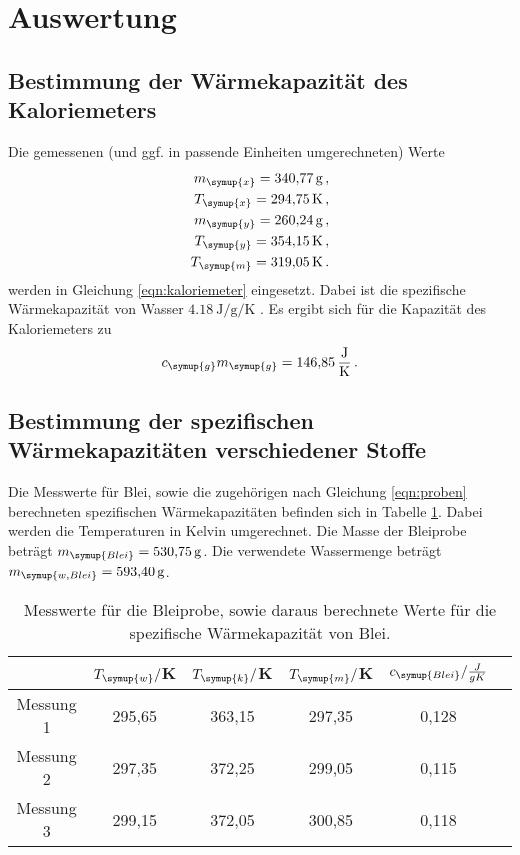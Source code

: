 \section{Auswertung}
\label{sec:Auswertung}

\subsection{Bestimmung der Wärmekapazität des Kaloriemeters}
\label{sec:Auswertung_Kaloriemeter}

Die gemessenen (und ggf. in passende Einheiten umgerechneten) Werte
\begin{align*}
  m_{\symup{x}} = \SI{340.77}{\gram}   \,,\\
  T_{\symup{x}} = \SI{294.75}{\kelvin} \,,\\
  m_{\symup{y}} = \SI{260.24}{\gram}   \,,\\
  T_{\symup{y}} = \SI{354.15}{\kelvin} \,,\\
  T_{\symup{m}} = \SI{319.05}{\kelvin} \,.\\
\end{align*}
werden in Gleichung \eqref{eqn:kaloriemeter} eingesetzt. Dabei ist die spezifische Wärmekapazität
von Wasser $\SI{4.18}{\joule\per\gram\per\kelvin}$ \cite{Versuchsanleitung}. Es ergibt sich für die Kapazität
des Kaloriemeters zu
\begin{equation}
  c_{\symup{g}}m_{\symup{g}} = \SI{146.85}{\joule\per\kelvin} \,.\nonumber
\end{equation}


\subsection{Bestimmung der spezifischen Wärmekapazitäten verschiedener Stoffe}
\label{sec:Auswertung_stoffe}

Die Messwerte für Blei, sowie die zugehörigen  nach Gleichung \ref{eqn:proben} berechneten spezifischen Wärmekapazitäten
befinden sich in Tabelle \ref{tab:blei}. Dabei werden die Temperaturen in Kelvin umgerechnet.
Die Masse der Bleiprobe beträgt $m_{\symup{Blei}}=\SI{530.75}{\gram}$. Die verwendete
Wassermenge beträgt $m_{\symup{w,Blei}}=\SI{593.40}{\gram}$.

\begin{table}
  \centering
  \caption{Messwerte für die Bleiprobe, sowie daraus berechnete Werte für die spezifische
  Wärmekapazität von Blei.}
  \label{tab:blei}
  \begin{tabular}{c c c c c c}
    \toprule
    & $T_{\symup{w}}/$K & $T_{\symup{k}}/$K & $T_{\symup{m}}/$K & $c_{\symup{Blei}}/\frac{J}{g K}$ \\
    \midrule
    Messung 1 & 295,65 & 363,15 & 297,35 & 0,128 \\
    Messung 2 & 297,35 & 372,25 & 299,05 & 0,115 \\
    Messung 3 & 299,15 & 372,05 & 300,85 & 0,118 \\
    \bottomrule
  \end{tabular}
\end{table}

